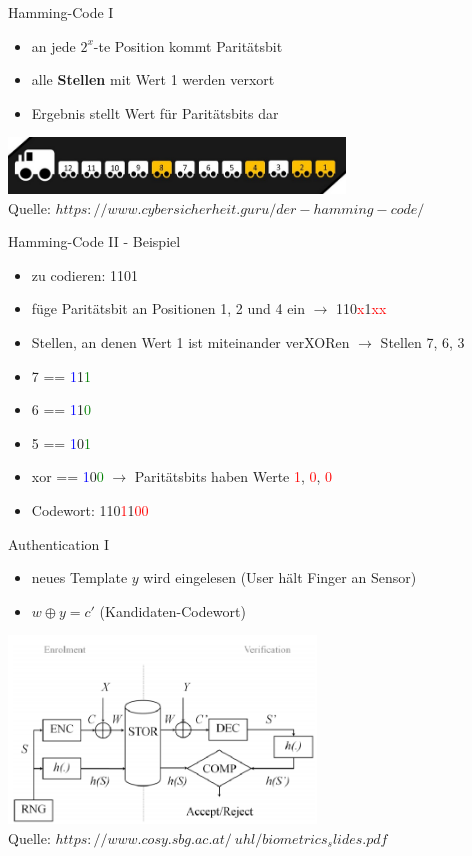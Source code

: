 \documentclass{beamer}
\begin{document}
\begin{frame}{Hamming-Code I}
	\begin{itemize}
		\item an jede $2^{x}$-te Position kommt Parit\"atsbit
		\item alle \textbf{Stellen} mit Wert 1 werden verxort
		\item Ergebnis stellt Wert für Parit\"atsbits dar
	\end{itemize}
	\vspace{10mm}\includegraphics[height=1.5cm]{hamming_zug.png}\\
	\tiny{Quelle: \textit{\tiny{$https://www.cybersicherheit.guru/der-hamming-code/$}}}
\end{frame}
\begin{frame}{Hamming-Code II - Beispiel}
	\begin{itemize}
		\item zu codieren: 1101
		\item f\"uge Parit\"atsbit an Positionen 1, 2 und 4 ein $\rightarrow$ 110\textcolor{red}{x}1\textcolor{red}{xx}
		\item Stellen, an denen Wert 1 ist miteinander verXORen $\rightarrow$ Stellen 7, 6, 3
		\item 7 	== \textcolor{blue}{1}1\textcolor{green}{1}
		\item 6 == \textcolor{blue}{1}1\textcolor{green}{0}
		\item 5 == \textcolor{blue}{1}0\textcolor{green}{1}
		\item xor == \textcolor{blue}{1}0\textcolor{green}{0} $\rightarrow$ Parit\"atsbits haben Werte \textcolor{red}{1}, \textcolor{red}{0}, \textcolor{red}{0}
		\item Codewort: 110\textcolor{red}{1}1\textcolor{red}{00}
	\end{itemize}
\end{frame}
\begin{frame}{Authentication I}
	\begin{itemize}
		\item neues Template $y$ wird eingelesen (User hält Finger an Sensor)
		\item $w \oplus y = c'$ (Kandidaten-Codewort)
	\end{itemize}
	\hspace{10mm}\includegraphics[height=5cm]{fcs.png}\\
	\tiny{Quelle: \textit{\tiny{$https://www.cosy.sbg.ac.at/~uhl/biometrics_slides.pdf$}}}
\end{frame}
\end{document}
